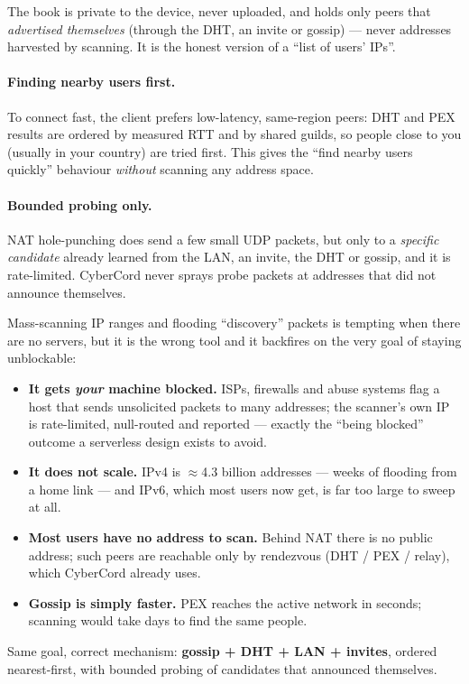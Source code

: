 \documentclass[11pt,a4paper]{article}
\begin{document}
\noindent The book is private to the device, never uploaded, and holds only peers that
\emph{advertised themselves} (through the DHT, an invite or gossip) --- never addresses
harvested by scanning. It is the honest version of a ``list of users' IPs''.

\paragraph{Finding nearby users first.} To connect fast, the client prefers low-latency,
same-region peers: DHT and PEX results are ordered by measured RTT and by shared guilds,
so people close to you (usually in your country) are tried first. This gives the
``find nearby users quickly'' behaviour \emph{without} scanning any address space.

\paragraph{Bounded probing only.} NAT hole-punching does send a few small UDP packets, but
only to a \emph{specific candidate} already learned from the LAN, an invite, the DHT or
gossip, and it is rate-limited. CyberCord never sprays probe packets at addresses that did
not announce themselves.

\begin{honest}
Mass-scanning IP ranges and flooding ``discovery'' packets is tempting when there are no
servers, but it is the wrong tool and it backfires on the very goal of staying unblockable:
\begin{itemize}[leftmargin=1.2em]
  \item \textbf{It gets \emph{your} machine blocked.} ISPs, firewalls and abuse systems
        flag a host that sends unsolicited packets to many addresses; the scanner's own IP
        is rate-limited, null-routed and reported --- exactly the ``being blocked'' outcome
        a serverless design exists to avoid.
  \item \textbf{It does not scale.} IPv4 is $\approx$4.3 billion addresses --- weeks of
        flooding from a home link --- and IPv6, which most users now get, is far too large
        to sweep at all.
  \item \textbf{Most users have no address to scan.} Behind NAT there is no public address;
        such peers are reachable only by rendezvous (DHT / PEX / relay), which CyberCord
        already uses.
  \item \textbf{Gossip is simply faster.} PEX reaches the active network in seconds;
        scanning would take days to find the same people.
\end{itemize}
Same goal, correct mechanism: \textbf{gossip + DHT + LAN + invites}, ordered nearest-first,
with bounded probing of candidates that announced themselves.
\end{honest}
\end{document}
